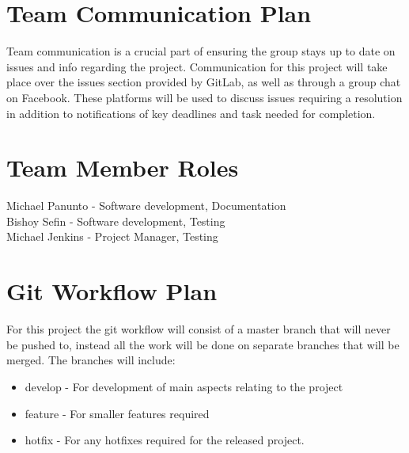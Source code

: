 \documentclass[a4paper]{article}
\begin{document}
    
    

\section{Team Communication Plan}
    \label{sec:CommunicationPlan}

    Team communication is a crucial part of ensuring the group stays up to date on issues and info regarding the project. Communication for this project will take place over the issues section provided by GitLab, as well as through a group chat on Facebook. These platforms will be used to discuss issues requiring a resolution in addition to notifications of key deadlines and task needed for completion.

\section{Team Member Roles}
    \label{sec:Roles}

    Michael Panunto - Software development, Documentation \\
    Bishoy Sefin - Software development, Testing \\
    Michael Jenkins - Project Manager, Testing

\section{Git Workflow Plan}
    \label{sec:gitWorkflow}

    For this project the git workflow will consist of a master branch that will never be pushed to, instead all the work will be done on separate branches that will be merged. The branches will include: 
    \begin{itemize}
        \item develop - For development of main aspects relating to the project
        \item feature - For smaller features required
        \item hotfix - For any hotfixes required for the released project.
    \end{itemize}

\end{document}
